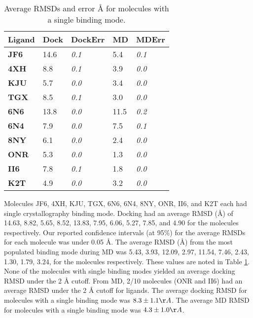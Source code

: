 \documentclass[journal=jcisd8,manuscript=article]{achemso}
\begin{document}
\begin{table}[]
\begin{tabular}{|l|l|l|l|l|}
\hline
\textbf{Ligand} & \textbf{Dock} & \textbf{DockErr} & \textbf{MD} & \textbf{MDErr} \\ \hline
\textbf{JF6}    & 14.6          & \textit{0.1}     & 5.4         & \textit{0.1}   \\ \hline
\textbf{4XH}    & 8.8           & \textit{0.1}     & 3.9         & \textit{0.0}   \\ \hline
\textbf{KJU}    & 5.7           & \textit{0.0}     & 3.4         & \textit{0.0}   \\ \hline
\textbf{TGX}    & 8.5           & \textit{0.1}     & 3.0         & \textit{0.0}   \\ \hline
\textbf{6N6}    & 13.8          & \textit{0.0}     & 11.5        & \textit{0.2}   \\ \hline
\textbf{6N4}    & 7.9           & \textit{0.0}     & 7.5         & \textit{0.1}   \\ \hline
\textbf{8NY}    & 6.1           & \textit{0.0}     & 2.4         & \textit{0.0}   \\ \hline
\textbf{ONR}    & 5.3           & \textit{0.0}     & 1.3         & \textit{0.0}   \\ \hline
\textbf{II6}    & 7.8           & \textit{0.1}     & 1.8         & \textit{0.0}   \\ \hline
\textbf{K2T}    & 4.9           & \textit{0.0}     & 3.2         & \textit{0.0}   \\ \hline
\end{tabular}
\caption{Average RMSDs and error {\AA} for molecules with a single binding mode.}
\label{table:singlebm}
\end{table}


Molecules JF6, 4XH, KJU, TGX, 6N6, 6N4,  8NY, ONR, II6, and K2T each had single crystallography binding mode.
Docking had an average RMSD ({\AA}) of 14.63, 8.82, 5.65, 8.52, 13.83, 7.95, 6.06, 5.27, 7.85, and 4.90 for the molecules respectively.
Our reported confidence intervals (at 95\%) for the average RMSDs for each molecule was under 0.05 {\AA}.
The average RMSD ({\AA}) from the most populated binding mode during MD was 5.43, 3.93, 12.09, 2.97, 11.54, 7.46, 2.43, 1.30, 1.79, 3.24, for the molecules respectively.
These values are noted in Table \ref{table:singlebm}.
None of the molecules with single binding modes yielded an average docking RMSD under the 2 {\AA} cutoff.
From MD, 2/10 molecules (ONR and II6) had an average RMSD under the 2 {\AA} cutoff for ligands.
The average docking RMSD for molecules with a single binding mode was $8.3 \pm 1.1 {\AA}$.
The average MD RMSD for molecules with a single binding mode was $4.3 \pm 1.0 {\AA}$.
\end{document}
